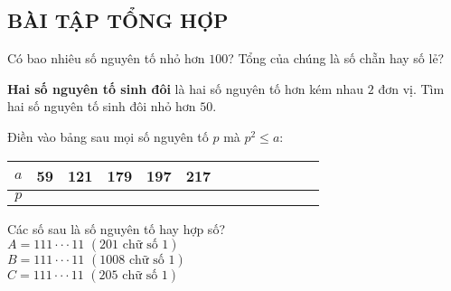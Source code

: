 \begin{bt}
\subsection{BÀI TẬP TỔNG HỢP}
\end{bt}   \begin{bt}
Có bao nhiêu số nguyên tố nhỏ hơn $100$? Tổng của chúng là số chẵn hay số lẻ?
\end{bt}   \begin{bt}
\textbf{Hai số nguyên tố sinh đôi} là hai số nguyên tố hơn kém nhau $2$ đơn vị. Tìm hai số nguyên tố sinh đôi nhỏ hơn $50$.
\end{bt}   \begin{bt}
Điền vào bảng sau mọi số nguyên tố $p$ mà ${p^2} \le a$:
\begin{center}
\begin{tabular}{|c|c|c|c|c|c|c|c|c|c|c|c|c|}
\hline
{$a$} & {59} & {121} & {179} & {197} & {217} \\
\hline
{$p$} &  &  & & & \\
\hline
\end{tabular}
\end{center}
\end{bt}   \begin{bt}
Các số sau là số nguyên tố hay hợp số?\\
$A = 111 \cdot \cdot \cdot 11 \,\, (201 \,\,\text{chữ số} \,\,1)$\\
$B = 111 \cdot \cdot \cdot 11 \,\, (1008 \,\,\text{chữ số} \,\,1)$\\
$C = 111 \cdot \cdot \cdot 11 \,\, (205 \,\,\text{chữ số} \,\,1)$
\end{bt} 